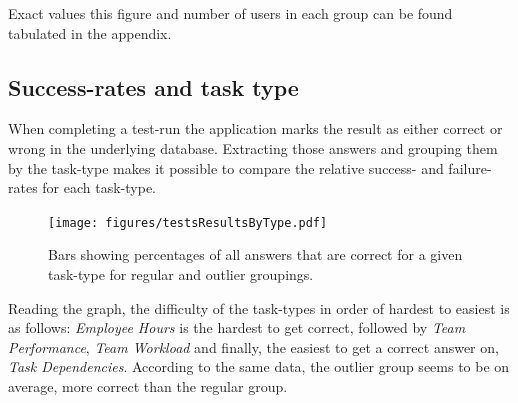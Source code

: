 \documentclass[nofilelist,dvipsnames]{cslthse-msc}
\begin{document}
        Exact values this figure and number of users in each group can be found
        tabulated in the appendix. 

%

      \subsection{Success-rates and task type}

        When completing a test-run the application marks the result as
        either correct or wrong in the underlying database. Extracting
        those answers and grouping them by the task-type makes it possible to
        compare the relative success- and failure-rates for each task-type.

				\begin{figure}[h!]
					\centering
          \texttt{[image: figures/testsResultsByType.pdf]}
          \caption{
            Bars showing percentages of all answers that are correct for a
            given task-type for regular and outlier groupings.
          }
				\end{figure}

        Reading the graph, the difficulty of the task-types in order of hardest
        to easiest is as follows: \textit{Employee Hours} is the hardest to get
        correct, followed by \textit{Team Performance}, \textit{Team Workload}
        and finally, the easiest to get a correct answer on, \textit{Task
          Dependencies}. According to the same data, the outlier group seems to
        be on average, more correct than the regular group.


\end{document}
